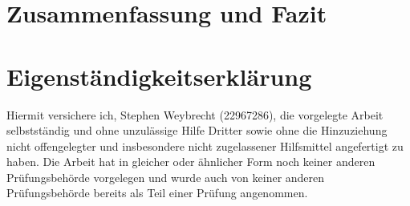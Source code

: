 \documentclass[11pt,a4paper,twoside,headsepline,numbers=noenddot,toc=bibliography,cleardoublepage=empty,parskip=half,DIV=calc,BCOR=6mm,pagesize=pdftex]{article}
\begin{document}
\section{Zusammenfassung und Fazit}
\label{sec:Fazit}

\clearpage
\mbox{}
\clearpage



%     




\renewcommand\refname{Bibliography}
\printbibliography[
heading=bibintoc,
title={Bibliografie}
]



% 


\clearpage
\section*{Eigenständigkeitserklärung}
Hiermit versichere ich, Stephen Weybrecht (22967286), die vorgelegte Arbeit selbstständig und ohne unzulässige Hilfe Dritter sowie ohne die Hinzuziehung nicht offengelegter und insbesondere nicht zugelassener Hilfsmittel angefertigt zu haben. Die Arbeit hat in gleicher oder ähnlicher Form noch keiner anderen Prüfungsbehörde vorgelegen und wurde auch von keiner anderen Prüfungsbehörde bereits als Teil einer Prüfung angenommen.\\
\end{document}

